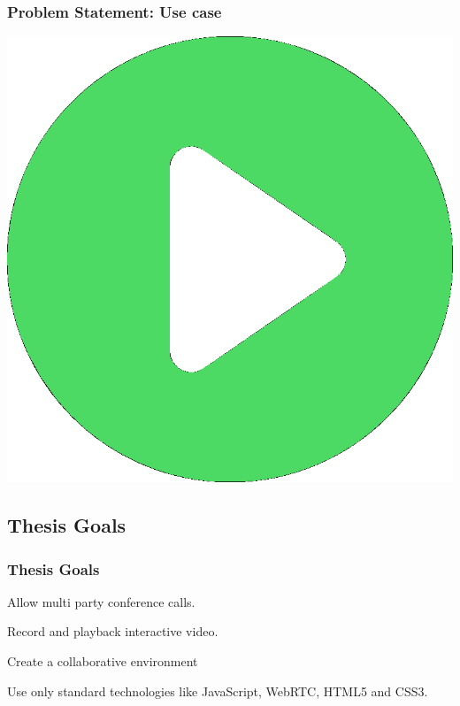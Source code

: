 \documentclass[compress]{beamer}
\begin{document}
  		\begin{frame}[c]
		\frametitle{Problem Statement: Use case}
	
		\begin{center}
		\href{run:video.mp4}{
		\includegraphics[scale=0.25]
		{video.eps}}
		\end{center}


		\end{frame}



		
	

	\subsection{Thesis Goals} %
  		\begin{frame}[c]
		\frametitle{Thesis Goals}
		Allow multi party conference calls.

		\vfill
		
		Record and playback interactive video.
		
		\vfill

        Create a collaborative environment        

        \vfill

		Use only standard technologies like JavaScript, WebRTC, HTML5 and CSS3.


		\end{frame}
\end{document}
